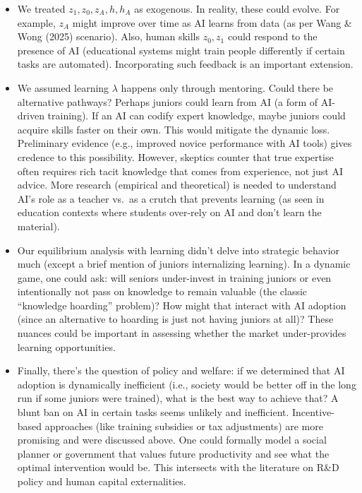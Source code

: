 \documentclass[12pt]{article}
\begin{document}
\begin{itemize}

\item
  We treated \(z_1, z_0, z_A, h, h_A\) as exogenous. In reality, these
  could evolve. For example, \(z_A\) might improve over time as AI
  learns from data (as per Wang \& Wong (2025) scenario). Also, human
  skills \(z_0, z_1\) could respond to the presence of AI (educational
  systems might train people differently if certain tasks are
  automated). Incorporating such feedback is an important extension.
\item
  We assumed learning \(\lambda\) happens only through mentoring. Could
  there be alternative pathways? Perhaps juniors could learn from AI (a
  form of AI-driven training). If an AI can codify expert knowledge,
  maybe juniors could acquire skills faster on their own. This would
  mitigate the dynamic loss. Preliminary evidence (e.g., improved novice
  performance with AI tools) gives credence to this possibility.
  However, skeptics counter that true expertise often requires rich
  tacit knowledge that comes from experience, not just AI advice. More
  research (empirical and theoretical) is needed to understand AI's role
  as a teacher vs.~as a crutch that {prevents} learning (as seen in
  education contexts where students over-rely on AI and don't learn the
  material).
\item
  Our equilibrium analysis with learning didn't delve into strategic
  behavior much (except a brief mention of juniors internalizing
  learning). In a dynamic game, one could ask: will seniors
  {under-invest in training} juniors or even intentionally not pass
  on knowledge to remain valuable (the classic ``knowledge hoarding''
  problem)? How might that interact with AI adoption (since an
  alternative to hoarding is just not having juniors at all)? These
  nuances could be important in assessing whether the market
  under-provides learning opportunities.
\item
  Finally, there's the question of {policy and welfare}: if we
  determined that AI adoption is dynamically inefficient (i.e., society
  would be better off in the long run if some juniors were trained),
  what is the best way to achieve that? A blunt ban on AI in certain
  tasks seems unlikely and inefficient. Incentive-based approaches (like
  training subsidies or tax adjustments) are more promising and were
  discussed above. One could formally model a social planner or
  government that values future productivity and see what the optimal
  intervention would be. This intersects with the literature on R\&D
  policy and human capital externalities.
\end{itemize}
\end{document}
